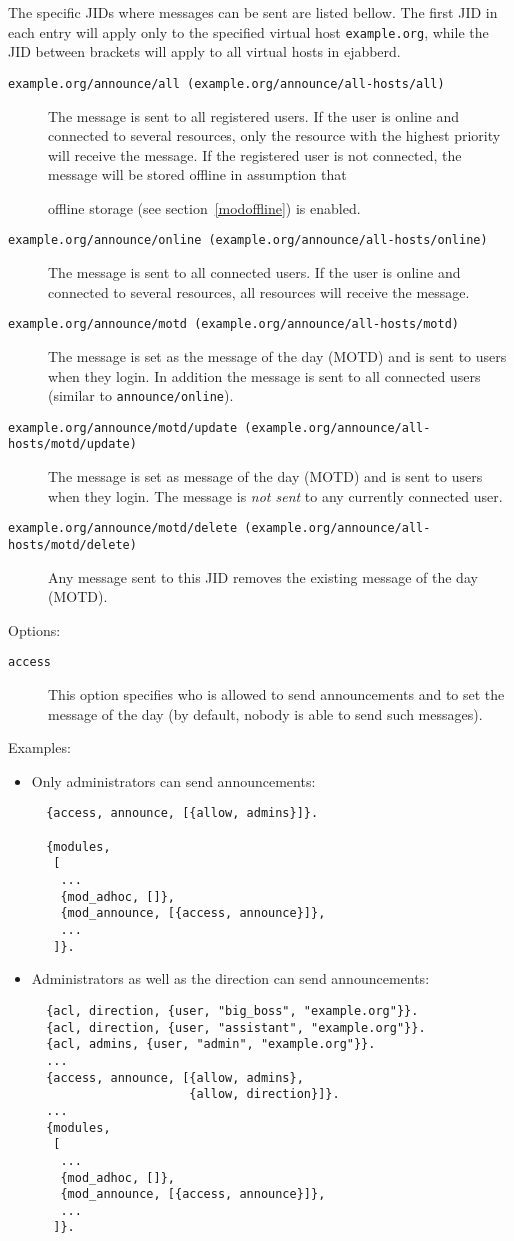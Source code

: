 \documentclass[a4paper,10pt]{book}
\newcommand{\ind}[1]{\begin{latexonly}\index{#1}\end{latexonly}}
\newcommand{\bracehack}{\def\{{\char"7B}\def\}{\char"7D}}
\newcommand{\titem}[1]{\item[\bracehack\texttt{#1}]}
\newcommand{\jid}[1]{\texttt{#1}}
\newcommand{\term}[1]{\texttt{#1}}
\newcommand{\module}[1]{\texttt{#1}}
\newcommand{\modoffline}{\module{mod\_offline}}
\begin{document}
The specific JIDs where messages can be sent are listed bellow.
The first JID in each entry will apply only to the specified virtual host
\jid{example.org}, while the JID between brackets will apply to all virtual
hosts in ejabberd.
\begin{description}
\titem{example.org/announce/all (example.org/announce/all-hosts/all)} The
  message is sent to all registered users. If the user is online and connected
  to several resources, only the resource with the highest priority will receive
  the message. If the registered user is not connected, the message will be
  stored offline in assumption that \ind{modules!\modoffline{}}offline storage
  (see section~\ref{modoffline}) is enabled.
\titem{example.org/announce/online (example.org/announce/all-hosts/online)}The
  message is sent to all connected users. If the user is online and connected
  to several resources, all resources will receive the message.
\titem{example.org/announce/motd (example.org/announce/all-hosts/motd)}The
  message is set as the message of the day (MOTD) and is sent to users when they
  login. In addition the message is sent to all connected users (similar to
  \term{announce/online}).
\titem{example.org/announce/motd/update (example.org/announce/all-hosts/motd/update)}
  The message is set as message of the day (MOTD) and is sent to users when they
  login. The message is \emph{not sent} to any currently connected user.
\titem{example.org/announce/motd/delete (example.org/announce/all-hosts/motd/delete)}
  Any message sent to this JID removes the existing message of the day (MOTD).
\end{description}

Options:
\begin{description}
\titem{access} \ind{options!access}This option specifies who is allowed to
  send announcements and to set the message of the day (by default, nobody is
  able to send such messages).
\end{description}

Examples:
\begin{itemize}
\item Only administrators can send announcements:
  \begin{verbatim}
  {access, announce, [{allow, admins}]}.

  {modules,
   [
    ...
    {mod_adhoc, []},
    {mod_announce, [{access, announce}]},
    ...
   ]}.
\end{verbatim}
\item Administrators as well as the direction can send announcements:
\begin{verbatim}
  {acl, direction, {user, "big_boss", "example.org"}}.
  {acl, direction, {user, "assistant", "example.org"}}.
  {acl, admins, {user, "admin", "example.org"}}.
  ...
  {access, announce, [{allow, admins},
                      {allow, direction}]}.
  ...
  {modules,
   [
    ...
    {mod_adhoc, []},
    {mod_announce, [{access, announce}]},
    ...
   ]}.
\end{verbatim}
\end{itemize}
\end{document}
